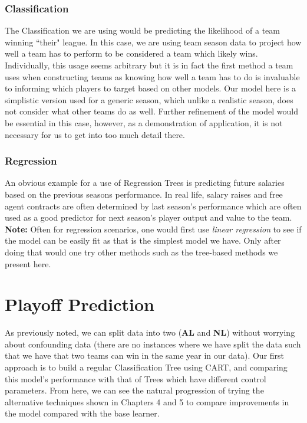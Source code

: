 \documentclass[11pt,a4paper]{report}
\begin{document}
\subsubsection{Classification}
The Classification we are using would be predicting the likelihood of a team winning ``their" league.
In this case, we are using team season data to project how well a team has to perform to be considered a team which likely wins.
Individually, this usage seems arbitrary but it is in fact the first method a team uses when constructing teams as knowing how well a team has to do is invaluable to informing which players to target based on other models.
Our model here is a simplistic version used for a generic season, which unlike a realistic season, does not consider what other teams do as well. 
Further refinement of the model would be essential in this case, however, as a demonstration of application, it is not necessary for us to get into too much detail there.

\subsubsection{Regression}
An obvious example for a use of Regression Trees is predicting future salaries based on the previous seasons performance. 
In real life, salary raises and free agent contracts are often determined by last season's performance which are often used as a good predictor for next season's player output and value to the team.
\medskip\\
\textbf{Note:} Often for regression scenarios, one would first use \textit{linear regression} to see if the model can be easily fit as that is the simplest model we have.
Only after doing that would one try other methods such as the tree-based methods we present here.

\section{Playoff Prediction}
As previously noted, we can split data into two (\textbf{AL} and \textbf{NL}) without worrying about confounding data (there are no instances where we have split the data such that we have that two teams can win in the same year in our data).
Our first approach is to build a regular Classification Tree using CART, and comparing this model's performance with that of Trees which have different control parameters. 
From here, we can see the natural progression of trying the alternative techniques shown in Chapters 4 and 5 to compare improvements in the model compared with the base learner.
\end{document}
